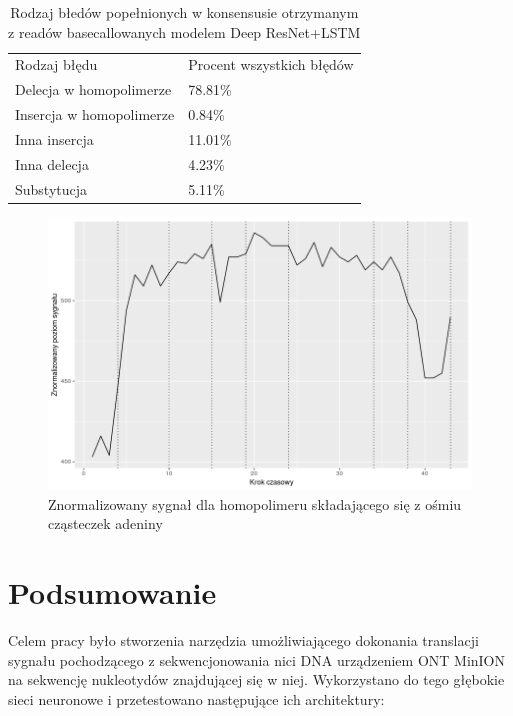 \documentclass[a4paper,11pt,twoside]{report}
\theoremstyle{definition}
\begin{document}
\begin{table}[]
	\begin{tabular}{ll}
		Rodzaj błędu             & Procent wszystkich błędów \\
		Delecja w homopolimerze  & 78.81\%                   \\
		Insercja w homopolimerze & 0.84\%                    \\
		Inna insercja            & 11.01\%                   \\
		Inna delecja             & 4.23\%                    \\
		Substytucja              & 5.11\%                   
	\end{tabular}
	\caption{Rodzaj błedów popełnionych w konsensusie otrzymanym z readów basecallowanych modelem Deep ResNet+LSTM}
	\label{table:errors}
\end{table}

\begin{figure}[h!]
	\centering
	\includegraphics[scale=0.7]{homopolymer}
	\caption{Znormalizowany sygnał dla homopolimeru składającego się z ośmiu cząsteczek adeniny }
	\label{fig:homopolymer}
\end{figure}

\chapter{Podsumowanie}

Celem pracy było stworzenia narzędzia umożliwiającego dokonania translacji sygnału pochodzącego z sekwencjonowania nici DNA urządzeniem ONT MinION na sekwencję nukleotydów znajdującej się w niej. Wykorzystano do tego głębokie sieci neuronowe i przetestowano następujące ich architektury:
\end{document}

